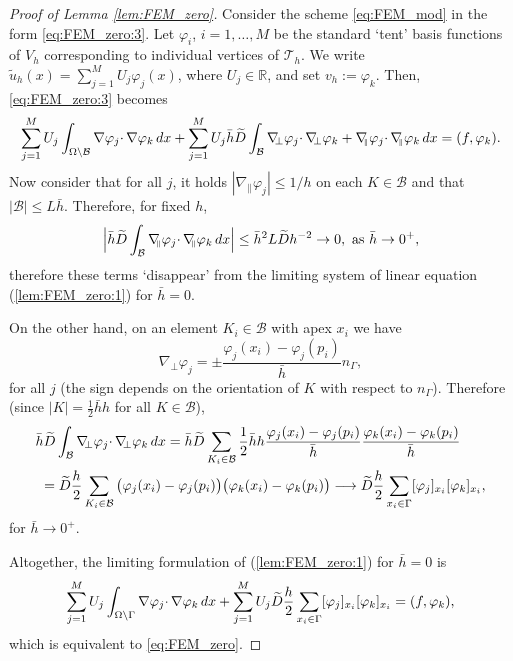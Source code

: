 \documentclass[10pt,a4paper]{amsart}
\def\B{\mathcal{B}}
\def \IR {\mathbb{R}}
\def \Th {{\mathcal T}_h}
\def \d {{\rm d}}
\def\dx{\,\d x }
\def\gradn{\nabla_{\!\!\perp}}
\def\gradt{\nabla_{\!\!{\scriptscriptstyle\parallel}}}
\def\tD{\widetilde{D}}
\def\tu{\tilde{u}}
\def\width{\bar{h}}
\begin{document}
\begin{proof}[Proof of Lemma \ref{lem:FEM_zero}]
Consider the scheme \eqref{eq:FEM_mod} in the form \eqref{eq:FEM_zero:3}. Let $\varphi_i$, $i=1,\ldots,M$ be the standard `tent' basis functions of $V_h$ corresponding to individual vertices of $\Th$. We write $\tu_h(x)=\sum_{j=1}^M U_j\varphi_j(x)$, where $U_j\in \IR$, and set $v_h:=\varphi_k$. Then, \eqref{eq:FEM_zero:3} becomes
\begin{equation}
\label{lem:FEM_zero:1}
\sum_{j=1}^M U_j\int_{\Omega\setminus\B} \nabla \varphi_j\cdotp\nabla \varphi_k \dx +\sum_{j=1}^M U_j\width\tD\int_{\B} \gradn \varphi_j \cdotp\gradn \varphi_k +\gradt \varphi_j\cdotp\gradt \varphi_k \dx=(f,\varphi_k).
\end{equation}
Now consider that for all $j$, it holds $|\gradt \varphi_j|\leq1/h$ on each $K\in\B$ and that $|\B|\leq L\width$. Therefore, for fixed $h$,
\begin{equation*}
\label{lem:FEM_zero:2}
\Big|\width\tD\int_{\B} \gradt \varphi_j\cdotp\gradt \varphi_k \dx\Big| \leq \width^2 L\tD h^{-2} \to 0,\text{ as }\width\to 0^+,
\end{equation*}
therefore these terms `disappear' from the limiting system of linear equation (\ref{lem:FEM_zero:1}) for $\width=0$.

On the other hand, on an element $K_i\in\B$ with apex $x_i$ we have
\begin{equation*}
\gradn \varphi_j=\pm\frac{\varphi_j(x_i)-\varphi_j(p_i)}{\width}n_\Gamma,
\end{equation*}
for all $j$ (the sign depends on the orientation of $K$ with respect to $n_\Gamma$). Therefore (since $|K|=\tfrac{1}{2}\width h$ for all $K\in\B$),
\begin{equation}
\nonumber
\label{lem:FEM_zero:3}
\begin{split}
&\width\tD\int_{\B} \gradn \varphi_j \cdotp\gradn \varphi_k \dx= \width\tD\sum_{K_i\in\B}\frac{1}{2}\width h \frac{\varphi_j(x_i)-\varphi_j(p_i)}{\width}
\frac{\varphi_k(x_i)-\varphi_k(p_i)}{\width}\\
&\ = \tD\frac{h}{2}\sum_{K_i\in\B} \big(\varphi_j(x_i)-\varphi_j(p_i)\big) \big(\varphi_k(x_i)-\varphi_k(p_i)\big)\longrightarrow \tD\frac{h}{2}\sum_{x_i\in\Gamma} [\varphi_j]_{x_i}[\varphi_k]_{x_i},
\end{split}
\end{equation}
for $\width\to 0^+$.

Altogether, the limiting formulation of (\ref{lem:FEM_zero:1}) for $\width=0$ is 
\begin{equation*}
\label{lem:FEM_zero:4}
\sum_{j=1}^M U_j\int_{\Omega\setminus\Gamma} \nabla \varphi_j\cdotp\nabla \varphi_k \dx +\sum_{j=1}^M U_j\tD\frac{h}{2} \sum_{x_i\in\Gamma} [\varphi_j]_{x_i}[\varphi_k]_{x_i} =(f,\varphi_k),
\end{equation*}
which is equivalent to \eqref{eq:FEM_zero}.

\end{proof}
\end{document}
